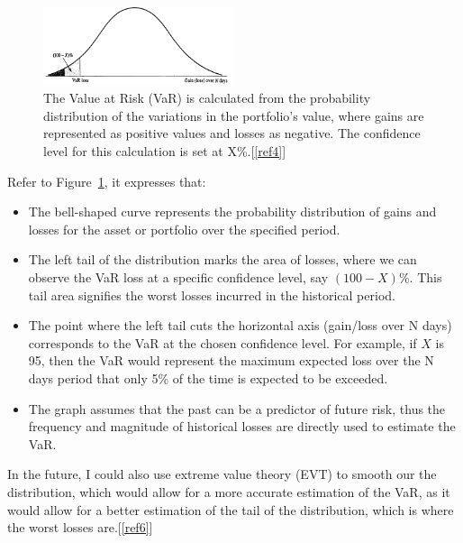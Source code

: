 \documentclass{article}
\begin{document}
\begin{figure}[h]
  \centering
  \includegraphics[width=0.5\textwidth]{Images/Image 1.png}
  \caption{The Value at Risk (VaR) is calculated from the probability distribution of the variations in the portfolio's value, where gains are represented as positive values and losses as negative. The confidence level for this calculation is set at X\%.[\ref{ref4}]}
  \label{VaR Distribution Curve}
\end{figure}

Refer to Figure~\ref{VaR Distribution Curve}, it expresses that:  
\begin{itemize}
  \item The bell-shaped curve represents the probability distribution of gains and losses for the asset or portfolio over the specified period.
  
  \item The left tail of the distribution marks the area of losses, where we can observe the VaR loss at a specific confidence level, say \( (100 - X)\% \). This tail area signifies the worst losses incurred in the historical period.
  
  \item The point where the left tail cuts the horizontal axis (gain/loss over N days) corresponds to the VaR at the chosen confidence level. For example, if \( X \) is 95, then the VaR would represent the maximum expected loss over the N days period that only 5\% of the time is expected to be exceeded.
  
  \item The graph assumes that the past can be a predictor of future risk, thus the frequency and magnitude of historical losses are directly used to estimate the VaR.
\end{itemize}

In the future, I could also use extreme value theory (EVT) to smooth our the distribution, which would allow for a more accurate estimation of the VaR, as it would allow for a better estimation of the tail of the distribution, which is where the worst losses are.[\ref{ref6}]\\\vspace{0.3cm}
\end{document}
